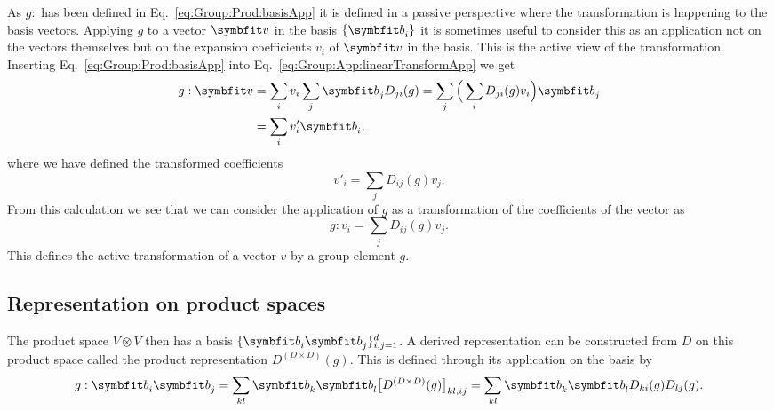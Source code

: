 As $g:$ has been defined in Eq.~\eqref{eq:Group:Prod:basisApp} it is defined in a passive perspective where the transformation is happening
to the basis vectors. Applying $g$ to a vector $\v{v}$ in the basis $\{\v{b}_i\}$ it is sometimes useful to consider this as an application not
on the vectors themselves but on the expansion coefficients $v_i$ of $\v{v}$ in the basis. This is the active view of the transformation.
Inserting Eq.~\eqref{eq:Group:Prod:basisApp} into Eq.~\eqref{eq:Group:App:linearTransformApp} we get
\begin{equation}
    \label{eq:Group:App:activeTransform}
    \begin{split}
        g:\v{v} &= \sum_iv_i\sum_j\v{b}_jD_{ji}(g) = \sum_j\Big(\sum_iD_{ji}(g)v_i\Big)\v{b}_j\\
        &= \sum_iv'_i\v{b}_i,
    \end{split}
\end{equation}
where we have defined the transformed coefficients
\begin{equation}
    \label{eq:Group:App:transformedCoeff}
    v'_i = \sum_jD_{ij}(g)v_j.
\end{equation}
From this calculation we see that we can consider the application of $g$ as a transformation of the coefficients of the vector as
\begin{equation}
    \label{eq:Group:App:coeffTransformation}
    g:v_i = \sum_jD_{ij}(g)v_j.
\end{equation}
This defines the active transformation of a vector $v$ by a group element $g$.

\subsection{Representation on product spaces}

The product space $V\otimes V$ then has a basis $\{\v{b}_i\v{b}_j\}_{i,j=1}^d$. A derived representation can be constructed from $D$ on this product space
called the product representation $D^{(D\times D)}(g)$. This is defined through its application on the basis by
\begin{equation}
    \label{eq:Group:Prod:prodBasisApp}
    g:\v{b}_i\v{b}_j = \sum_{kl}\v{b}_k\v{b}_l\big[D^{(D\times D)}(g)\big]_{kl,ij} = \sum_{kl}\v{b}_k\v{b}_lD_{ki}(g)D_{lj}(g).
\end{equation}

